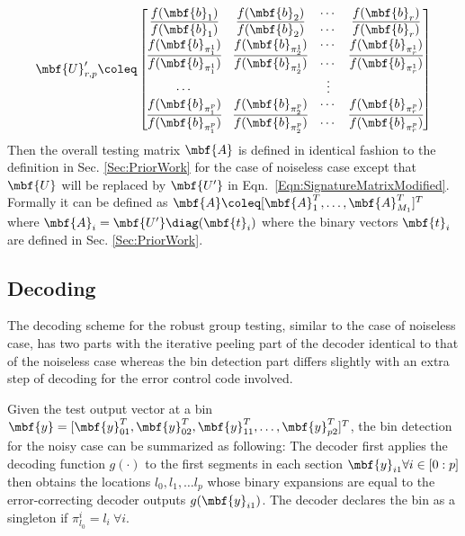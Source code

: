 \documentclass[conference,twocolumn]{IEEEtran}
\begin{document}
 \begin{align}
\label{Eqn:SignatureMatrixModified}
\mbf{U}_{r,p}'\coleq\begin{bmatrix}
f(\mbf{b}_1)  & f(\mbf{b}_2) &\cdots & f(\mbf{b}_r) \\
\overline{f(\mbf{b}_1)} & \overline{f(\mbf{b}_2)} & \cdots & \overline{f(\mbf{b}_r)}\\
f(\mbf{b}_{\pi^{1}_{1}}) & f(\mbf{b}_{\pi^{1}_{2}}) & \cdots & f(\mbf{b}_{\pi^{1}_{r}})\\
\overline{f(\mbf{b}_{\pi^{1}_{1}})} & \overline{f(\mbf{b}_{\pi^{1}_{2}})} & \cdots & \overline{f(\mbf{b}_{\pi^{1}_{r}})}\\
\cdots &  &\vdots \\
f(\mbf{b}_{\pi^{p}_{1}}) & f(\mbf{b}_{\pi^{p}_{2}}) & \cdots & f(\mbf{b}_{\pi^{p}_{r}})\\
\overline{f(\mbf{b}_{\pi^{p}_{1}})} & \overline{f(\mbf{b}_{\pi^{p}_{2}})} & \cdots & \overline{f(\mbf{b}_{\pi^{p}_{r}})}\\
\end{bmatrix}
\end{align}  
Then the overall testing matrix $\mbf{A}$ is defined in identical fashion to the definition in Sec. \ref{Sec:PriorWork} for the case of noiseless case except that $\mbf{U}$ will be replaced by $\mbf{U'}$ in Eqn.~\eqref{Eqn:SignatureMatrixModified}. Formally it can be defined as $\mbf{A}\coleq [\mbf{A}_{1}^{T},\ldots,\mbf{A}_{M_{1}}^{T}]^T$ where $\mbf{A}_{i}=\mbf{U'} \diag (\mbf{t}_i)$ where the binary vectors $\mbf{t}_i$ are defined in Sec. \ref{Sec:PriorWork}. 

\subsection*{Decoding}
The decoding scheme for the robust group testing, similar to the case of noiseless case, has two parts with the iterative peeling part of the decoder identical to that of the noiseless case whereas the bin detection part differs slightly with an extra step of decoding for the error control code involved.

Given the test output vector at a bin $\mbf{y}=[\mbf{y}^{T}_{01},\mbf{y}^{T}_{02},\mbf{y}^{T}_{11},\ldots,\mbf{y}^{T}_{p2}]^T$, the bin detection for the noisy case can be summarized as following: The decoder first applies the decoding function $g(\cdot)$ to the first segments in each section $\mbf{y}_{i1} \forall i\in[0:p]$ then obtains the locations $l_0,l_1,\ldots l_p$ whose binary expansions are equal to the error-correcting decoder outputs $g(\mbf{y}_{i1})$. The decoder declares the bin as a singleton if $\pi_{l_0}^{i}=l_i~\forall i$.
\end{document}
